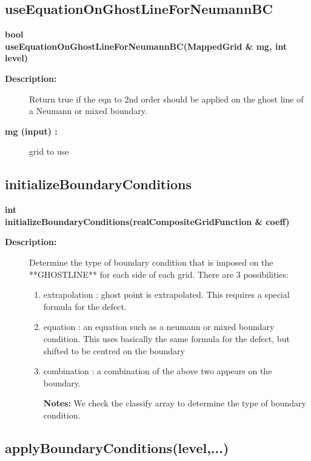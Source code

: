 \subsection{useEquationOnGhostLineForNeumannBC}
 
\begin{flushleft} \textbf{%
bool  \\ 
\settowidth{\OgmgIncludeArgIndent}{useEquationOnGhostLineForNeumannBC(}%
useEquationOnGhostLineForNeumannBC(MappedGrid \& mg, int level)
}\end{flushleft}
\begin{description}
\item[{\bf Description:}] 
    Return true if the eqn to 2nd order should be applied on the ghost line
 of a Neumann or mixed boundary.
\item[{\bf mg (input) :}]  grid to use
\end{description}
\subsection{initializeBoundaryConditions}
 
\begin{flushleft} \textbf{%
int  \\ 
\settowidth{\OgmgIncludeArgIndent}{initializeBoundaryConditions(}%
initializeBoundaryConditions(realCompositeGridFunction \& coeff)
}\end{flushleft}
\begin{description}
\item[{\bf Description:}] 
    Determine the type of boundary condition that is imposed on the **GHOSTLINE**
    for each side of each grid.
 There are 3 possibilities:
 \begin{enumerate}
   \item extrapolation : ghost point is extrapolated. This requires a special formula for the defect.
   \item equation : an equation such as a neumann or mixed boundary condition. This uses basically the
                same formula for the defect, but shifted to be centred on the boundary
   \item combination : a combination of the above two appears on the boundary.
\item[{\bf Notes:}] 
    We check the classify array to determine the type of boundary condition.
 \end{enumerate}
\end{description}
\subsection{applyBoundaryConditions(level,...)}
 
